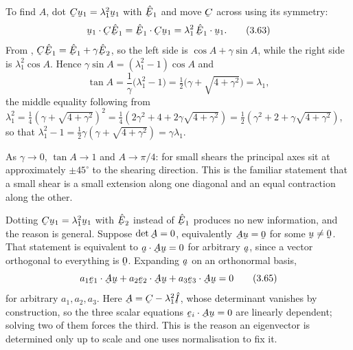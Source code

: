 To find $A$, dot $\bC\bu_{1}=\lambda_{1}^{2}\bu_{1}$ with $\hbE_{1}$ and
move $\bC$ across using its symmetry:
\begin{equation}
   \ip{\bu_{1}}{\bC\hbE_{1}}=\ip{\hbE_{1}}{\bC\bu_{1}}
   =\lambda_{1}^{2}\,\ip{\hbE_{1}}{\bu_{1}}.
   \tag{3.63}\label{eq:3.63}
\end{equation}
From , $\bC\hbE_{1}=\hbE_{1}+\gamma\hbE_{2}$, so the left side is
$\cos A+\gamma\sin A$, while the right side is $\lambda_{1}^{2}\cos A$.
Hence $\gamma\sin A=(\lambda_{1}^{2}-1)\cos A$ and
\begin{equation}
   \tan A=\frac{1}{\gamma}\big(\lambda_{1}^{2}-1\big)
        =\tfrac12\big(\gamma+\sqrt{4+\gamma^{2}}\big)=\lambda_{1},
   \tag{3.64}\label{eq:3.64}
\end{equation}
the middle equality following from
$\lambda_{1}^{2}=\tfrac14(\gamma+\sqrt{4+\gamma^{2}})^{2}
=\tfrac14(2\gamma^{2}+4+2\gamma\sqrt{4+\gamma^{2}})
=\tfrac12(\gamma^{2}+2+\gamma\sqrt{4+\gamma^{2}})$, so that
$\lambda_{1}^{2}-1=\tfrac12\gamma(\gamma+\sqrt{4+\gamma^{2}})
=\gamma\lambda_{1}$.

As $\gamma\to0$, $\tan A\to1$ and $A\to\pi/4$: for small shears the
principal axes sit at approximately $\pm45^{\circ}$ to the shearing
direction. This is the familiar statement that a small shear is a small
extension along one diagonal and an equal contraction along the other.

\begin{remark}
\label{rem:redundant}
Dotting $\bC\bu_{1}=\lambda_{1}^{2}\bu_{1}$ with $\hbE_{2}$ instead of
$\hbE_{1}$ produces no new information, and the reason is general. Suppose
$\det\bA=0$, equivalently $\bA\bu=\bze$ for some $\bu\neq\bze$. That
statement is equivalent to $\ip{\ba}{\bA\bu}=0$ for arbitrary $\ba$, since
a vector orthogonal to everything is $\bze$. Expanding $\ba$ on an
orthonormal basis,
\begin{equation}
   a_{1}\ip{\be_{1}}{\bA\bu}+a_{2}\ip{\be_{2}}{\bA\bu}
   +a_{3}\ip{\be_{3}}{\bA\bu}=0
   \tag{3.65}\label{eq:3.65}
\end{equation}
for arbitrary $a_{1},a_{2},a_{3}$. Here $\bA=\bC-\lambda_{1}^{2}\hI$,
whose determinant vanishes by construction, so the three scalar equations
$\ip{\be_{i}}{\bA\bu}=0$ are linearly dependent; solving two of them
forces the third. This is the reason an eigenvector is determined only up
to scale and one uses normalisation to fix it.
\end{remark}

